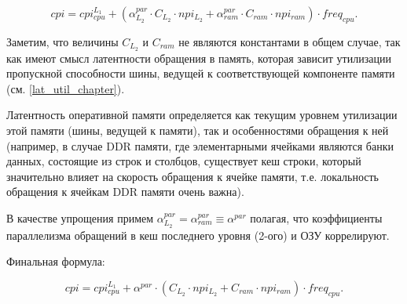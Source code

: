     \begin{equation}
        cpi = cpi_{cpu}^{L_1} +
        \left( \alpha_{L_2}^{par} \cdot C_{L_2} \cdot npi_{L_2} +
               \alpha_{ram}^{par} \cdot C_{ram} \cdot npi_{ram} \right) \cdot freq_{cpu}.
    \end{equation}

    Заметим, что величины $C_{L_2}$ и $C_{ram}$ не являются константами в общем случае, так как
    имеют смысл латентности обращения в память, которая зависит утилизации пропускной способности
    шины, ведущей к соответствующей компоненте памяти (см. \ref{lat_util_chapter}).

    Латентность оперативной памяти определяется как текущим уровнем утилизации этой памяти
    (шины, ведущей к памяти), так и особенностями обращения к ней (например, в случае DDR
    памяти, где элементарными ячейками являются банки данных, состоящие из строк и столбцов,
    существует кеш строки, который значительно влияет на скорость обращения
    к ячейке памяти, т.е. локальность обращения к ячейкам DDR памяти очень важна).

    В качестве упрощения примем $\alpha_{L_2}^{par} = \alpha_{ram}^{par} \equiv \alpha^{par}$ полагая,
    что коэффициенты параллелизма обращений в кеш последнего уровня (2-ого) и ОЗУ коррелируют.

    Финальная формула:

    \begin{equation} \label{cpi_formula}
        cpi = cpi_{cpu}^{L_1} + \alpha^{par} \cdot
        \left( C_{L_2} \cdot npi_{L_2} + C_{ram} \cdot npi_{ram} \right) \cdot freq_{cpu}.
    \end{equation}

